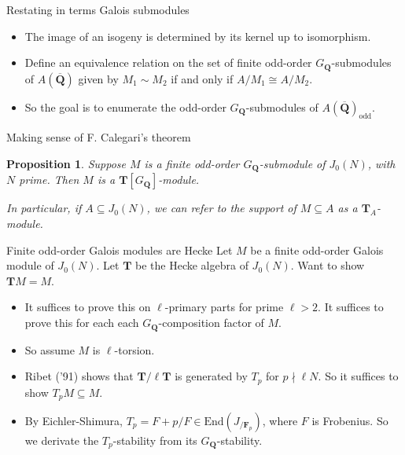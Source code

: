 \documentclass{beamer}
\newtheorem{proposition}[theorem]{Proposition}
\newcommand{\QQ}{\mathbf{Q}}
\newcommand{\QQbar}{\overline{\mathbf{Q}}}
\newcommand{\TT}{\mathbf{T}}
\newcommand{\F}{\mathbf{F}}
\newcommand{\End}{\mathrm{End}}
\begin{document}
\begin{frame}{Restating in terms Galois submodules}
    \begin{itemize}
        \item 
            The image of an isogeny is determined by its kernel up to isomorphism. 
        \item
            Define an equivalence relation on the set of finite odd-order
            $G_\QQ$-submodules of $A(\QQbar)$ given by $M_1\sim M_2$ if and only if
            $A/M_1\cong A/M_2$.
        \item
            So the goal is to enumerate the odd-order $G_\QQ$-submodules of
            $A(\QQbar)_\mathrm{odd}$.
    \end{itemize}
\end{frame}

\begin{frame}{Making sense of F. Calegari's theorem}
    \begin{proposition}
        Suppose $M$ is a finite odd-order $G_\QQ$-submodule of $J_0(N)$, with $N$
        prime. Then $M$ is a $\TT[G_\QQ]$-module.

        In particular, if $A\subseteq J_0(N)$, we can refer to the support of
        $M\subseteq A$ as a $\TT_A$-module.
    \end{proposition}
\end{frame}

\begin{frame}{Finite odd-order Galois modules are Hecke}
    Let $M$ be a finite odd-order Galois module of $J_0(N)$. Let $\TT$ be the
    Hecke algebra of $J_0(N)$. Want to show $\TT M = M$.
    \begin{itemize}
        \item
            It suffices to prove this on $\ell$-primary parts for prime
            $\ell>2$. It suffices to prove this for each each
            $G_\QQ$-composition factor of $M$. 
        \item
            So assume $M$ is $\ell$-torsion.
        \item
            Ribet ('91) shows that $\TT/\ell \TT$ is generated by $T_p$ for
            $p\nmid \ell N$. So it suffices to show $T_p M \subseteq M$.
        \item
            By Eichler-Shimura, $T_p = F+p/F\in \End(J_{/\F_p})$, where $F$ is
            Frobenius. So we derivate the $T_p$-stability from its
            $G_\QQ$-stability.
    \end{itemize}
\end{frame}
\end{document}
